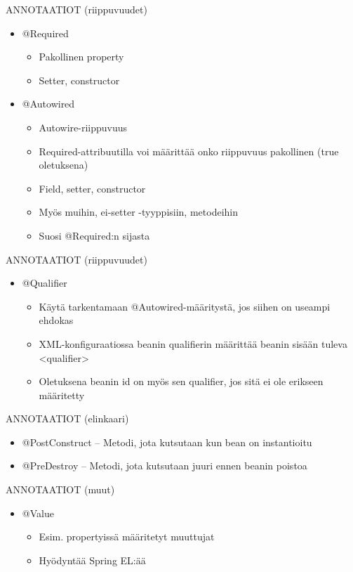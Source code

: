 \documentclass[hyperref={pdfauthor=\AUTHOR},14pt]{beamer}
\begin{document}
\begin{frame}[t, fragile]{ANNOTAATIOT (riippuvuudet)}
\begin{itemize}
 \item @Required
\begin{itemize}
 \item Pakollinen property
 \item Setter, constructor
\end{itemize}
 \item @Autowired 
\begin{itemize}
 \item Autowire-riippuvuus
 \item  Required-attribuutilla voi määrittää onko riippuvuus pakollinen (true oletuksena)
 \item  Field, setter, constructor
 \item  Myös muihin, ei-setter -tyyppisiin, metodeihin
 \item  Suosi @Required:n sijasta
\end{itemize}
\end{itemize}
\end{frame}
\begin{frame}[t, fragile]{ANNOTAATIOT (riippuvuudet) }
\begin{itemize}
 \item @Qualifier
\begin{itemize}
 \item  Käytä tarkentamaan @Autowired-määritystä, jos siihen on useampi ehdokas
 \item XML-konfiguraatiossa beanin qualifierin määrittää beanin sisään tuleva <qualifier>
 \item  Oletuksena beanin id on myös sen qualifier, jos sitä ei ole erikseen määritetty
\end{itemize}
\end{itemize}
\end{frame}
\begin{frame}[t, fragile]{ANNOTAATIOT (elinkaari)}
\begin{itemize}
 \item @PostConstruct
 -- Metodi, jota kutsutaan kun bean on instantioitu
 \item @PreDestroy
 -- Metodi, jota kutsutaan juuri ennen beanin poistoa
\end{itemize}
\end{frame}
\begin{frame}[t, fragile]{ANNOTAATIOT (muut)}
\begin{itemize}
\item @Value
\begin{itemize}
\item Esim. propertyissä määritetyt muuttujat
\item Hyödyntää Spring EL:ää
\end{itemize}
\end{itemize}
\end{frame}
\end{document}
